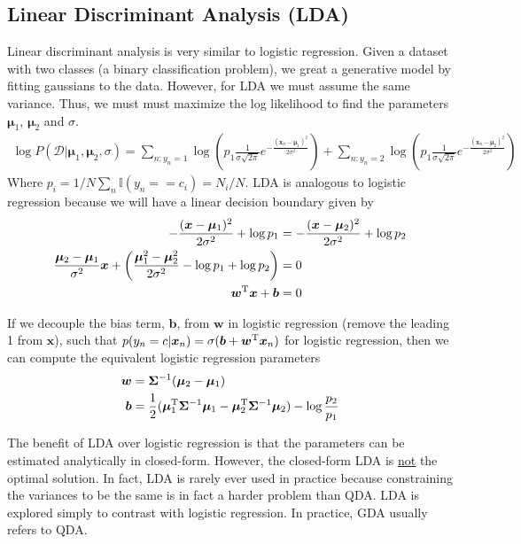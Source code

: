 \documentclass[11pt]{article}
\newcommand{\vct}[1]{\boldsymbol{#1}} %
\newcommand{\mat}[1]{\boldsymbol{#1}} %
\newcommand{\T}{^{\textrm T}} %
\newcommand{\ProbOpr}[1]{\mathbb{#1}}
\begin{document}
\subsection{Linear Discriminant Analysis (LDA)}
Linear discriminant analysis is very similar to logistic regression. Given a dataset with two classes (a binary classification problem), we great a generative model by fitting gaussians to the data. However, for LDA we must assume the same variance. Thus, we must must maximize the log likelihood to find the parameters $\vct{\mu}_1$, $\vct{\mu}_2$ and $\sigma$.
\begin{align*}
\log P(\mathcal{D}|\vct{\mu}_1, \vct{\mu}_2,\sigma) = \sum_{n:y_n=1} \log \left(p_1 \frac{1}{\sigma\sqrt{2\pi}}e^{-\frac{(\vct{x}_n - \vct{\mu}_1)^2}{2\sigma^2}}\right) + \sum_{n:y_n=2} \log \left(p_1 \frac{1}{\sigma\sqrt{2\pi}}e^{-\frac{(\vct{x}_n - \vct{\mu}_2)^2}{2\sigma^2}}\right)
\end{align*}
Where $p_i = 1/N \sum_n \ProbOpr{I}(y_n == c_i) = N_i/N$. LDA  is analogous to logistic regression because we will have a linear decision boundary given by
\begin{align*}
-\frac{(\vct{x} - \vct{\mu}_1)^2}{2\sigma^2} + \log p_1 &= -\frac{(\vct{x} - \vct{\mu}_2)^2}{2\sigma^2} + \log p_2\\
\frac{\vct{\mu}_2 - \vct{\mu}_1}{\sigma^2}\vct{x} + \left( \frac{\vct{\mu}_1^2 - \vct{\mu}_2^2}{2\sigma^2}  - \log p_1 + \log p_2\right) &= 0\\
\vct{w}\T \vct{x} + \vct{b} &= 0
\end{align*}

If we decouple the bias term, $\vct{b}$, from $\vct{w}$ in logistic regression (remove the leading 1 from $\vct{x}$), such that $p(y_n=c|\vct{x}_n) =  \sigma(\vct{b} + \vct{w}\T\vct{x}_n)$ for logistic regression, then we can compute the equivalent logistic regression parameters
\begin{align*}
\vct{w} &= \mat{\Sigma}^{-1}(\vct{\mu}_2 - \vct{\mu}_1)\\
\vct{b} &= \frac{1}{2}(\vct{\mu}_1\T\mat{\Sigma}^{-1}\vct{\mu}_1 - \vct{\mu}_2\T\mat{\Sigma}^{-1}\vct{\mu}_2) - \log \frac{p_2}{p_1}
\end{align*}

The benefit of LDA over logistic regression is that the parameters can be estimated analytically in closed-form. However, the closed-form LDA is \uline{not} the optimal solution. In fact, LDA is rarely ever used in practice because constraining the variances to be the same is in fact a harder problem than QDA. LDA is explored simply to contrast with logistic regression. In practice, GDA usually refers to QDA.
\end{document}
